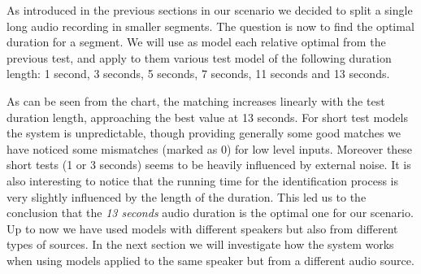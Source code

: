 As introduced in the previous sections in our scenario we decided to split a single
long audio recording in smaller segments. The question is now to find the optimal duration
for a segment. We will use as model each relative optimal from the previous test, and apply to them
various test model of the following duration length: 1 second, 3 seconds, 5 seconds, 7 seconds,
11 seconds and 13 seconds.

\begin{center}


\end{center}

As can be seen from the chart, the matching increases linearly with the test duration
length, approaching the best value at 13 seconds.\newline
For short test models the system is unpredictable, though providing generally some
good matches we have noticed some mismatches (marked as 0) for low level inputs. Moreover
these short tests (1 or 3 seconds) seems to be heavily influenced by external noise.\newline
It is also interesting to notice that the running time for the identification process is very slightly
influenced by the length of the duration. This led us to the conclusion that the \textit{13 seconds}
audio duration is the optimal one for our scenario.\newline
Up to now we have used models with different speakers but also from different types of sources. In the
next section we will investigate how the system works when using models applied to the same
speaker but from a different audio source.

